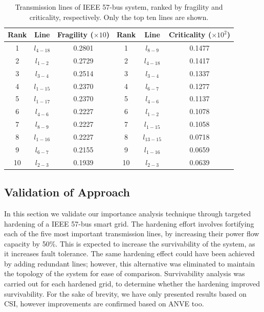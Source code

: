 \documentclass[review]{elsarticle}
\begin{document}
\begin{table}[t!]
\centering
\caption{Transmission lines of IEEE 57-bus system, ranked by fragility and criticality, respectively. Only the top ten lines are shown.}
\label{tab:weakness}
\renewcommand{\arraystretch}{1.1}
\renewcommand\tabcolsep{4pt}
\begin{tabular}{ccc|ccc}
  \textbf{Rank} & \textbf{Line} & \textbf{Fragility} \scriptsize($\times 10$) & \textbf{Rank} & \textbf{Line} & \textbf{Criticality} \scriptsize($\times 10^2$)\\
\hline
	1  & $l_{4-18}$ & 0.2801 & 1  & $l_{8-9}$   & 0.1477 \\
	2  & $l_{1-2}$  & 0.2729 & 2  & $l_{4-18}$  & 0.1417 \\
	3  & $l_{3-4}$  & 0.2514 & 3  & $l_{3-4}$   & 0.1337 \\
	4  & $l_{1-15}$ & 0.2370 & 4  & $l_{6-7}$   & 0.1277 \\
	5  & $l_{1-17}$ & 0.2370 & 5  & $l_{4-6}$   & 0.1137 \\
\hline
	6  & $l_{4-6}$  & 0.2227 & 6  & $l_{1-2}$   & 0.1078 \\
	7  & $l_{8-9}$  & 0.2227 & 7  & $l_{1-15}$  & 0.1058 \\
	8  & $l_{1-16}$ & 0.2227 & 8  & $l_{13-15}$ & 0.0718 \\
	9  & $l_{6-7}$  & 0.2155 & 9  & $l_{1-16}$  & 0.0659 \\
	10 & $l_{2-3}$  & 0.1939 & 10 & $l_{2-3}$   & 0.0639 \\
\end{tabular}
\end{table}

\subsection{Validation of Approach}
In this section we validate our importance analysis technique through targeted hardening of a IEEE 57-bus smart grid. The hardening effort involves fortifying each of the five most important transmission lines, by increasing their power flow capacity by 50\%. This is expected to increase the survivability of the system, as it increases fault tolerance. The same hardening effect could have been achieved by adding redundant lines; however, this alternative was eliminated to maintain the topology of the system for ease of comparison. Survivability analysis was carried out for each hardened grid, to determine whether the hardening improved survivability. For the sake of brevity, we have only presented results based on CSI, however improvements are confirmed based on ANVE too.
\end{document}
